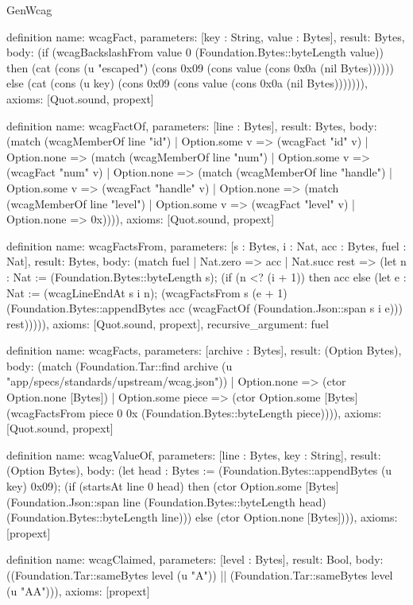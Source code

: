 \begin{lexlean}{GenWcag}
\begin{semanticmodule}
definition{
  name: wcagFact,
  parameters: [key : String, value : Bytes],
  result: Bytes,
  body: (if (wcagBackslashFrom value 0 (Foundation.Bytes::byteLength value)) then (cat (cons (u "escaped") (cons 0x09 (cons value (cons 0x0a (nil Bytes)))))) else (cat (cons (u key) (cons 0x09 (cons value (cons 0x0a (nil Bytes))))))),
  axioms: [Quot.sound, propext]
}

definition{
  name: wcagFactOf,
  parameters: [line : Bytes],
  result: Bytes,
  body: (match (wcagMemberOf line "id")
    | Option.some v => (wcagFact "id" v)
    | Option.none => (match (wcagMemberOf line "num")
      | Option.some v => (wcagFact "num" v)
      | Option.none => (match (wcagMemberOf line "handle")
        | Option.some v => (wcagFact "handle" v)
        | Option.none => (match (wcagMemberOf line "level")
          | Option.some v => (wcagFact "level" v)
          | Option.none => 0x)))),
  axioms: [Quot.sound, propext]
}

definition{
  name: wcagFactsFrom,
  parameters: [s : Bytes, i : Nat, acc : Bytes, fuel : Nat],
  result: Bytes,
  body: (match fuel
    | Nat.zero => acc
    | Nat.succ rest => (let n : Nat := (Foundation.Bytes::byteLength s); (if (n <? (i + 1)) then acc else (let e : Nat := (wcagLineEndAt s i n); (wcagFactsFrom s (e + 1) (Foundation.Bytes::appendBytes acc (wcagFactOf (Foundation.Json::span s i e))) rest))))),
  axioms: [Quot.sound, propext],
  recursive_argument: fuel
}

definition{
  name: wcagFacts,
  parameters: [archive : Bytes],
  result: (Option Bytes),
  body: (match (Foundation.Tar::find archive (u "app/specs/standards/upstream/wcag.json"))
    | Option.none => (ctor Option.none [Bytes])
    | Option.some piece => (ctor Option.some [Bytes] (wcagFactsFrom piece 0 0x (Foundation.Bytes::byteLength piece)))),
  axioms: [Quot.sound, propext]
}

definition{
  name: wcagValueOf,
  parameters: [line : Bytes, key : String],
  result: (Option Bytes),
  body: (let head : Bytes := (Foundation.Bytes::appendBytes (u key) 0x09); (if (startsAt line 0 head) then (ctor Option.some [Bytes] (Foundation.Json::span line (Foundation.Bytes::byteLength head) (Foundation.Bytes::byteLength line))) else (ctor Option.none [Bytes]))),
  axioms: [propext]
}

definition{
  name: wcagClaimed,
  parameters: [level : Bytes],
  result: Bool,
  body: ((Foundation.Tar::sameBytes level (u "A")) || (Foundation.Tar::sameBytes level (u "AA"))),
  axioms: [propext]
}


\end{semanticmodule}
\end{lexlean}
